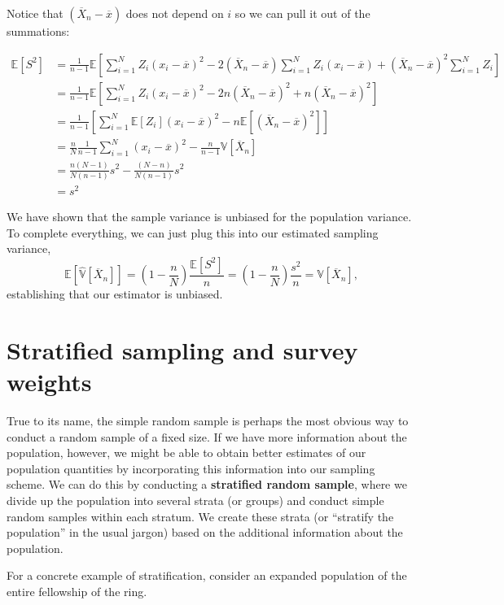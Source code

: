 \documentclass[
  letterpaper,
  DIV=11,
  numbers=noendperiod]{scrreprt}
\newcommand{\E}{\mathbb{E}}
\newcommand{\V}{\mathbb{V}}
\newcommand{\Xbar}{\overline{X}}
\theoremstyle{definition}
\theoremstyle{definition}
\theoremstyle{plain}
\theoremstyle{remark}
\begin{document}
Notice that \((\Xbar_n - \overline{x})\) does not depend on \(i\) so we
can pull it out of the summations:

\[
\begin{aligned}
\E[S^2] &= \frac{1}{n-1}  \E\left[\sum_{i=1}^N Z_i(x_i - \overline{x})^2 -2(\Xbar_n - \overline{x}) \sum_{i=1}^N Z_i(x_i - \overline{x}) + (\Xbar_n - \overline{x})^2 \sum_{i=1}^N Z_i\right] \\
 &= \frac{1}{n-1}  \E\left[\sum_{i=1}^N Z_i(x_i - \overline{x})^2 -2n(\Xbar_n - \overline{x})^2  + n(\Xbar_n - \overline{x})^2\right] \\
 &= \frac{1}{n-1}  \left[\sum_{i=1}^N \E[Z_i] (x_i - \overline{x})^2 -n\E[(\Xbar_n - \overline{x})^2]\right] \\
 &= \frac{n}{N}\frac{1}{n-1}\sum_{i=1}^N (x_i - \overline{x})^2 -\frac{n}{n-1}\V[\Xbar_n] \\
 &= \frac{n(N-1)}{N(n-1)}s^2 -\frac{(N-n)}{N(n-1)}s^2 \\
 &= s^2
\end{aligned}
\]

We have shown that the sample variance is unbiased for the population
variance. To complete everything, we can just plug this into our
estimated sampling variance, \[
\E\left[\widehat{\V}[\Xbar_n]\right] = \left(1 - \frac{n}{N}\right)\frac{\E\left[S^2\right]}{n} = \left(1 - \frac{n}{N}\right)\frac{s^2}{n} = \V[\Xbar_n],
\] establishing that our estimator is unbiased.

\hypertarget{stratified-sampling-and-survey-weights}{%
\section{Stratified sampling and survey
weights}\label{stratified-sampling-and-survey-weights}}

True to its name, the simple random sample is perhaps the most obvious
way to conduct a random sample of a fixed size. If we have more
information about the population, however, we might be able to obtain
better estimates of our population quantities by incorporating this
information into our sampling scheme. We can do this by conducting a
\textbf{stratified random sample}, where we divide up the population
into several strata (or groups) and conduct simple random samples within
each stratum. We create these strata (or ``stratify the population'' in
the usual jargon) based on the additional information about the
population.

For a concrete example of stratification, consider an expanded
population of the entire fellowship of the ring.
\end{document}
